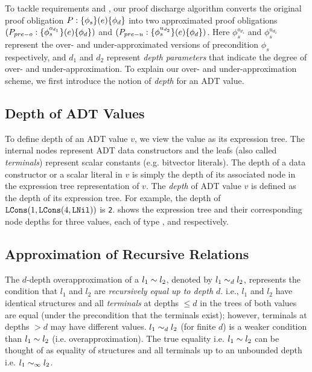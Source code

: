 To tackle requirements  and ,
our proof discharge algorithm converts the original proof obligation $P: \{\phi_s\}(e)\{\phi_d\}$
into two approximated proof obligations $(P_{pre-o}: \{\phi^{o_{d_1}}_s\}(e)\{\phi_d\})$
and $(P_{pre-u}: \{\phi^{u_{d_2}}_s\}(e)\{\phi_d\})$.
Here $\phi^{o_{d_1}}_s$ and $\phi^{u_{d_2}}_s$ represent the over- and under-approximated
versions of precondition $\phi_s$ respectively, and $d_1$ and $d_2$ represent
{\em depth parameters} that indicate the degree of over- and under-approximation.
To explain our over- and under-approximation scheme, we
first introduce the notion of {\em depth} for an ADT value.



\subsection{Depth of ADT Values}
\label{sec:adtdepth}
To define depth of an ADT value $v$, we view the value as its expression tree.
The internal nodes represent ADT data constructors and
the leafs (also called {\em terminals}) represent scalar constants (e.g. bitvector literals).
The depth of a data constructor or a scalar literal in $v$ is simply the depth of
its associated node in the expression tree representation of $v$.
The {\em depth} of ADT value $v$ is defined as the depth of its expression tree.
For example, the depth of ${\tt LCons}(1, {\tt LCons}(4, {\tt LNil}))$ is {\tt 2}.
 shows the expression tree and their corresponding node depths for three values,
each of type ,  and  respectively.

\subsection{Approximation of Recursive Relations}
\label{sec:approxdefs}
The $d$-depth overapproximation of a \recursiveRelation{} $l_1 \sim{} l_2$,
denoted by $l_1 \sim_{d} l_2$, represents the condition that
$l_1$ and $l_2$ are {\em recursively equal up to depth $d$}. i.e.,
$l_1$ and $l_2$ have identical structures and all
{\em terminals} at depths $\leq d$ in the trees of both values
are equal (under the precondition that the terminals exist);
however, terminals at depths $>d$ may have different values.
$l_1 \sim_{d} l_2$ (for finite $d$) is a weaker
condition than $l_1 \sim{} l_2$ (i.e. overapproximation).
The true equality i.e. $l_1 \sim{} l_2$ can be thought of as equality of structures
and all terminals up to an unbounded depth i.e. $l_1 \sim_{\infty} l_2$.

